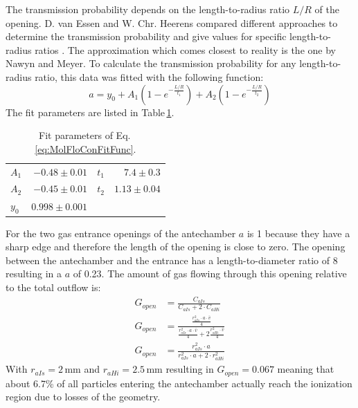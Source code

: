 		The transmission probability depends on the length-to-radius ratio $L/R$ of the opening. D. van Essen and W. Chr. Heerens compared different approaches to determine the transmission probability and give values for specific length-to-radius ratios \cite{molFlowTubeTransm_Essen1976}. The approximation which comes closest to reality is the one by Nawyn and Meyer. To calculate the transmission probability for any length-to-radius ratio, this data was fitted with the following function:
		\begin{equation}
			a = y_0 + A_1\left(1-e^{-\frac{L/R}{t_1}}\right) + A_2\left(1-e^{-\frac{L/R}{t_2}}\right)
			\label{eq:MolFloConFitFunc}
		\end{equation}
		The fit parameters are listed in Table\,\ref{tab:thMolFloConFiPara}.
		\begin{table}[h!]
			\begin{center}
				\begin{tabular}{l r| l r }
					$A_1$	& $-0.48 \pm 0.01$ & $t_1$	& $7.4 \pm 0.3$	\\
					$A_2$	& $-0.45 \pm 0.01$ & $t_2$	& $1.13 \pm 0.04$ \\
					$y_0$ 	& $0.998 \pm 0.001$	& &\\
				\end{tabular}
			\end{center}
			\caption{Fit parameters of Eq.\,\eqref{eq:MolFloConFitFunc}.}
			\label{tab:thMolFloConFiPara}
		\end{table}	
		For the two gas entrance openings of the antechamber $a$ is 1 because they have a sharp edge and therefore the length of the opening is close to zero. The opening between the antechamber and the entrance has a length-to-diameter ratio of 8 resulting in a $a$ of 0.23. The amount of gas flowing through this opening relative to the total outflow is:
		\begin{align}
			G_{open} & = \frac{C_{aIs}}{C_{aIs} + 2\cdot C_{aHi}} \label{eq:GAntOpen}\\
			G_{open} & = \frac{\frac{r_{aIs}^2\cdot a\cdot \bar{v}}{4}}{\frac{r_{aIs}^2\cdot a\cdot \bar{v}}{4} + 2\frac{r_{aHi}^2\cdot \bar{v}}{4}}\\
			G_{open} &= \frac{r_{aIs}^2\cdot a}{r_{aIs}^2\cdot a + 2\cdot r_{aHi}^2}
		\end{align}
		With $r_{aIs} = 2\,\si{\milli\meter}$ and $r_{aHi} = 2.5\,\si{\milli\meter}$ resulting in $G_{open} = 0.067$ meaning that about 6.7\% of all particles entering the antechamber actually reach the ionization region due to losses of the geometry.\\
		
